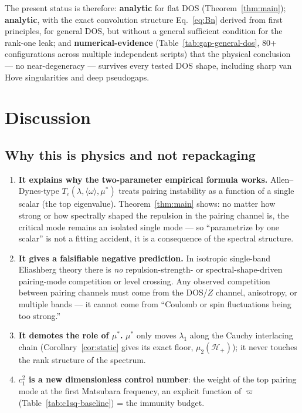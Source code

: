 \documentclass[11pt]{article}
\newcommand{\HH}{\mathcal{H}}
\begin{document}
The present status is therefore: \textbf{analytic} for flat DOS
(Theorem~\ref{thm:main}); \textbf{analytic}, with the exact convolution
structure Eq.~\eqref{eq:Bn} derived from first principles, for general DOS,
but without a general sufficient condition for the rank-one leak; and
\textbf{numerical-evidence} (Table~\ref{tab:gap-general-dos}, 80+
configurations across multiple independent scripts) that the physical
conclusion --- no near-degeneracy --- survives every tested DOS shape,
including sharp van Hove singularities and deep pseudogaps.

\section{Discussion}\label{sec:discussion}

\subsection{Why this is physics and not repackaging}

\begin{enumerate}
\item \textbf{It explains why the two-parameter empirical formula works.}
Allen--Dynes-type $T_c(\lambda,\langle\omega\rangle,\mu^*)$ treats pairing
instability as a function of a single scalar (the top eigenvalue).
Theorem~\ref{thm:main} shows: no matter how strong or how spectrally shaped
the repulsion in the pairing channel is, the critical mode remains an
isolated single mode --- so ``parametrize by one scalar'' is not a fitting
accident, it is a consequence of the spectral structure.
\item \textbf{It gives a falsifiable negative prediction.} In isotropic
single-band Eliashberg theory there is \emph{no} repulsion-strength- or
spectral-shape-driven pairing-mode competition or level crossing. Any
observed competition between pairing channels must come from the DOS/$Z$
channel, anisotropy, or multiple bands --- it cannot come from ``Coulomb or
spin fluctuations being too strong.''
\item \textbf{It demotes the role of $\mu^*$.} $\mu^*$ only moves $\lambda_1$
along the Cauchy interlacing chain (Corollary~\ref{cor:static} gives its
exact floor, $\mu_2(\HH_+)$); it never touches the rank structure of the
spectrum.
\item \textbf{$c_1^2$ is a new dimensionless control number}: the weight of
the top pairing mode at the first Matsubara frequency, an explicit function
of $\varpi$ (Table~\ref{tab:c1sq-baseline}) = the immunity budget.
\end{enumerate}
\end{document}

